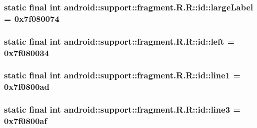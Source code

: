 \hypertarget{classandroid_1_1support_1_1fragment_1_1_r_1_1id_e59b09325c388466ce068620d68e43cf}{
\subsubsection[{largeLabel}]{\setlength{\rightskip}{0pt plus 5cm}static final int android::support::fragment.R.R::id::largeLabel = 0x7f080074}}
\label{classandroid_1_1support_1_1fragment_1_1_r_1_1id_e59b09325c388466ce068620d68e43cf}


\hypertarget{classandroid_1_1support_1_1fragment_1_1_r_1_1id_e4d8a02a0dd47bdd13956335f53de067}{
\subsubsection[{left}]{\setlength{\rightskip}{0pt plus 5cm}static final int android::support::fragment.R.R::id::left = 0x7f080034}}
\label{classandroid_1_1support_1_1fragment_1_1_r_1_1id_e4d8a02a0dd47bdd13956335f53de067}


\hypertarget{classandroid_1_1support_1_1fragment_1_1_r_1_1id_9ba4e6abcc0d7b96fdede2d8cdbd6c20}{
\subsubsection[{line1}]{\setlength{\rightskip}{0pt plus 5cm}static final int android::support::fragment.R.R::id::line1 = 0x7f0800ad}}
\label{classandroid_1_1support_1_1fragment_1_1_r_1_1id_9ba4e6abcc0d7b96fdede2d8cdbd6c20}


\hypertarget{classandroid_1_1support_1_1fragment_1_1_r_1_1id_ae799a253f6b05e3545347ac5c605011}{
\subsubsection[{line3}]{\setlength{\rightskip}{0pt plus 5cm}static final int android::support::fragment.R.R::id::line3 = 0x7f0800af}}
\label{classandroid_1_1support_1_1fragment_1_1_r_1_1id_ae799a253f6b05e3545347ac5c605011}


